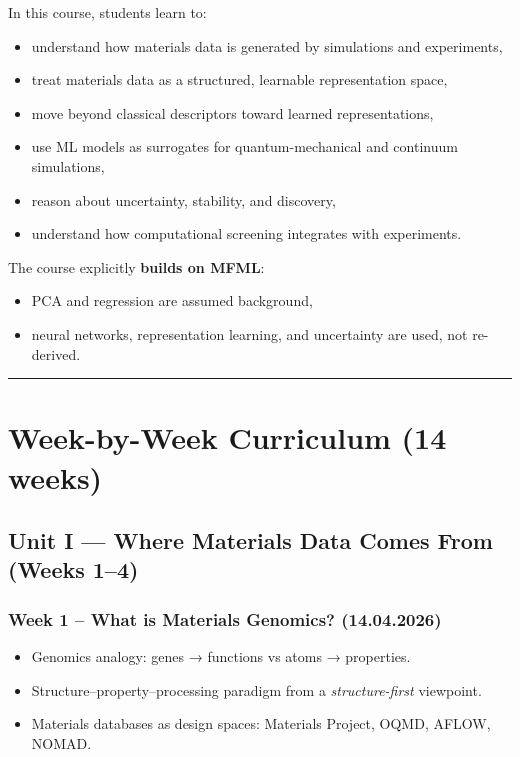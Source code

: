 \documentclass[
]{agujournal2019}
\providecommand{\tightlist}{%
  \setlength{\itemsep}{0pt}\setlength{\parskip}{0pt}}
\begin{document}
In this course, students learn to:

\begin{itemize}
\tightlist
\item
  understand how materials data is generated by simulations and
  experiments,
\item
  treat materials data as a structured, learnable representation space,
\item
  move beyond classical descriptors toward learned representations,
\item
  use ML models as surrogates for quantum-mechanical and continuum
  simulations,
\item
  reason about uncertainty, stability, and discovery,
\item
  understand how computational screening integrates with experiments.
\end{itemize}

The course explicitly \textbf{builds on MFML}:

\begin{itemize}
\tightlist
\item
  PCA and regression are assumed background,
\item
  neural networks, representation learning, and uncertainty are used,
  not re-derived.
\end{itemize}

\begin{center}\rule{0.5\linewidth}{0.5pt}\end{center}

\section{Week-by-Week Curriculum (14
weeks)}\label{week-by-week-curriculum-14-weeks}

\subsection{Unit I --- Where Materials Data Comes From (Weeks
1--4)}\label{unit-i-where-materials-data-comes-from-weeks-14}

\subsubsection{Week 1 -- What is Materials Genomics?
(14.04.2026)}\label{week-1-what-is-materials-genomics-14.04.2026}

\begin{itemize}
\tightlist
\item
  Genomics analogy: genes → functions vs atoms → properties.
\item
  Structure--property--processing paradigm from a \emph{structure-first}
  viewpoint.
\item
  Materials databases as design spaces: Materials Project, OQMD, AFLOW,
  NOMAD.
\end{itemize}
\end{document}
